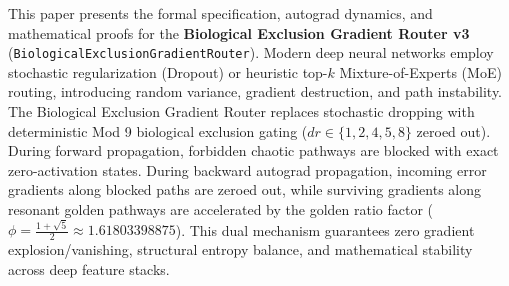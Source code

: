 \begin{abstractbox}
This paper presents the formal specification, autograd dynamics, and mathematical proofs for the \textbf{Biological Exclusion Gradient Router v3} (\texttt{BiologicalExclusionGradientRouter}). Modern deep neural networks employ stochastic regularization (Dropout) or heuristic top-$k$ Mixture-of-Experts (MoE) routing, introducing random variance, gradient destruction, and path instability. The Biological Exclusion Gradient Router replaces stochastic dropping with deterministic Mod 9 biological exclusion gating ($dr \in \{1, 2, 4, 5, 8\}$ zeroed out). During forward propagation, forbidden chaotic pathways are blocked with exact zero-activation states. During backward autograd propagation, incoming error gradients along blocked paths are zeroed out, while surviving gradients along resonant golden pathways are accelerated by the golden ratio factor ($\phi = \frac{1+\sqrt{5}}{2} \approx 1.61803398875$). This dual mechanism guarantees zero gradient explosion/vanishing, structural entropy balance, and mathematical stability across deep feature stacks.
\end{abstractbox}
